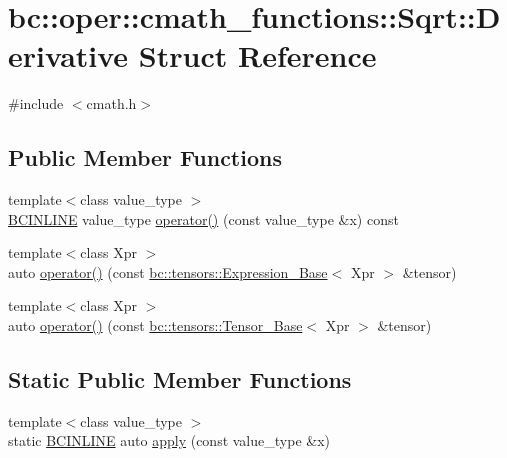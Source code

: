 \hypertarget{structbc_1_1oper_1_1cmath__functions_1_1Sqrt_1_1Derivative}{}\section{bc\+:\+:oper\+:\+:cmath\+\_\+functions\+:\+:Sqrt\+:\+:Derivative Struct Reference}
\label{structbc_1_1oper_1_1cmath__functions_1_1Sqrt_1_1Derivative}


{\ttfamily \#include $<$cmath.\+h$>$}

\subsection*{Public Member Functions}
\begin{DoxyCompactItemize}
\item 
{\footnotesize template$<$class value\+\_\+type $>$ }\\\hyperlink{common_8h_a6699e8b0449da5c0fafb878e59c1d4b1}{B\+C\+I\+N\+L\+I\+NE} value\+\_\+type \hyperlink{structbc_1_1oper_1_1cmath__functions_1_1Sqrt_1_1Derivative_af367bf217161dea016fa8d70ed74bc48}{operator()} (const value\+\_\+type \&x) const
\item 
{\footnotesize template$<$class Xpr $>$ }\\auto \hyperlink{structbc_1_1oper_1_1cmath__functions_1_1Sqrt_1_1Derivative_aaeb593258823b5a70e4290e17836eaf6}{operator()} (const \hyperlink{classbc_1_1tensors_1_1Expression__Base}{bc\+::tensors\+::\+Expression\+\_\+\+Base}$<$ Xpr $>$ \&tensor)
\item 
{\footnotesize template$<$class Xpr $>$ }\\auto \hyperlink{structbc_1_1oper_1_1cmath__functions_1_1Sqrt_1_1Derivative_a0eb9954a0375433c76a1ad7f508648ad}{operator()} (const \hyperlink{classbc_1_1tensors_1_1Tensor__Base}{bc\+::tensors\+::\+Tensor\+\_\+\+Base}$<$ Xpr $>$ \&tensor)
\end{DoxyCompactItemize}
\subsection*{Static Public Member Functions}
\begin{DoxyCompactItemize}
\item 
{\footnotesize template$<$class value\+\_\+type $>$ }\\static \hyperlink{common_8h_a6699e8b0449da5c0fafb878e59c1d4b1}{B\+C\+I\+N\+L\+I\+NE} auto \hyperlink{structbc_1_1oper_1_1cmath__functions_1_1Sqrt_1_1Derivative_ae64799ba4f1ff436699f082ca8fba1c2}{apply} (const value\+\_\+type \&x)
\end{DoxyCompactItemize}


